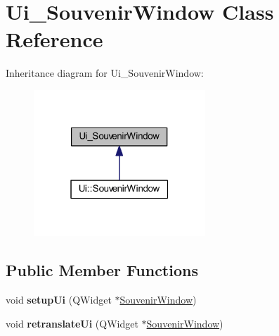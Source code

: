 \hypertarget{class_ui___souvenir_window}{}\section{Ui\+\_\+\+Souvenir\+Window Class Reference}
\label{class_ui___souvenir_window}


Inheritance diagram for Ui\+\_\+\+Souvenir\+Window\+:\nopagebreak
\begin{figure}[H]
\begin{center}
\leavevmode
\includegraphics[width=183pt]{class_ui___souvenir_window__inherit__graph}
\end{center}
\end{figure}
\subsection*{Public Member Functions}
\begin{DoxyCompactItemize}
\item 
\mbox{\label{class_ui___souvenir_window_af5ff661a48429953fe938abd3e11de51}} 
void {\bfseries setup\+Ui} (Q\+Widget $\ast$\mbox{\hyperlink{class_souvenir_window}{Souvenir\+Window}})
\item 
\mbox{\label{class_ui___souvenir_window_ae8d7748061cf9b78d7fc37c08e57b23b}} 
void {\bfseries retranslate\+Ui} (Q\+Widget $\ast$\mbox{\hyperlink{class_souvenir_window}{Souvenir\+Window}})
\end{DoxyCompactItemize}
